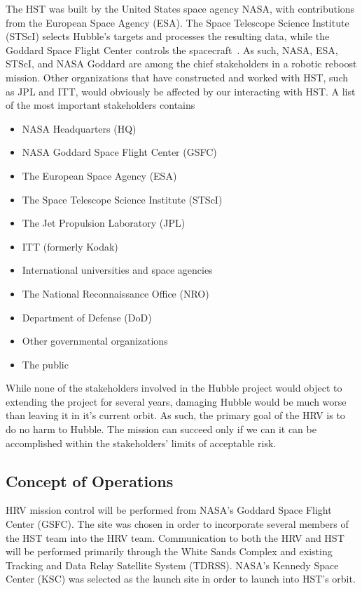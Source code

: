 \documentclass[paper=letter, fontsize=11pt]{scrartcl} %
\numberwithin{equation}{section} %
\numberwithin{figure}{section} %
\numberwithin{table}{section} %
\begin{document}
The HST was built by the United States space agency NASA, with contributions from the European Space Agency (ESA). The Space Telescope Science Institute (STScI) selects Hubble's targets and processes the resulting data, while the Goddard Space Flight Center controls the spacecraft~\cite{hubble_essentials}. As such, NASA, ESA, STScI, and NASA Goddard are among the chief stakeholders in a robotic reboost mission. Other organizations that have constructed and worked with HST, such as JPL and ITT, would obviously be affected by our interacting with HST. A list of the most important stakeholders contains
\begin{itemize}
    \setlength\itemsep{0em}
    \item NASA Headquarters (HQ)
    \item NASA Goddard Space Flight Center (GSFC)
    \item The European Space Agency (ESA)
    \item The Space Telescope Science Institute (STScI)
    \item The Jet Propulsion Laboratory (JPL)
    \item ITT (formerly Kodak)
    \item International universities and space agencies
    \item The National Reconnaissance Office (NRO)
    \item Department of Defense (DoD)
    \item Other governmental organizations
    \item The public
\end{itemize}

While none of the stakeholders involved in the Hubble project would object to extending the project for several years, damaging Hubble would be much worse than leaving it in it's current orbit. As such, the primary goal of the HRV is to do no harm to Hubble. The mission can succeed only if we can it can be accomplished within the stakeholders' limits of acceptable risk.

\subsection{Concept of Operations}
HRV mission control will be performed from NASA's Goddard Space Flight Center (GSFC). The site was chosen in order to incorporate several members of the HST team into the HRV team. Communication to both the HRV and HST will be performed primarily through the White Sands Complex and existing Tracking and Data Relay Satellite System (TDRSS). NASA's Kennedy Space Center (KSC) was selected as the launch site in order to launch into HST's orbit.
\end{document}
